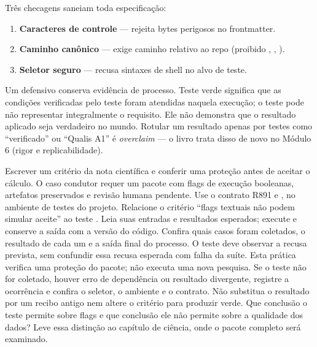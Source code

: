 \begin{metodo}
Três checagens saneiam toda especificação:
\begin{enumerate}[leftmargin=1.4em,itemsep=1pt]
\item \textbf{Caracteres de controle} — 
rejeita bytes perigosos no frontmatter.
\item \textbf{Caminho canônico} — 
exige caminho relativo ao repo (proibido \pth{/}, \pth{\textbackslash}, ).
\item \textbf{Seletor seguro} —  recusa
sintaxes de shell no alvo de teste.
\end{enumerate}
\end{metodo}

\begin{aviso}
Um  defensivo conserva evidência de processo.
Teste verde significa que as condições verificadas pelo teste foram atendidas
naquela execução; o teste pode não representar integralmente o requisito.
Ele não demonstra que o resultado aplicado seja verdadeiro no mundo.
Rotular um resultado apenas por testes como “verificado” ou “Qualis A1” é
\emph{overclaim} — o livro trata disso de novo no Módulo 6 (rigor e
replicabilidade).
\end{aviso}

\praticacore
{Escrever um critério da nota científica e conferir uma proteção antes de aceitar o cálculo.}
{O caso condutor requer um pacote com flags de execução booleanas, artefatos preservados e revisão humana pendente. Use o contrato R891 e , no ambiente de testes do projeto.}
{Relacione o critério ``flags textuais não podem simular aceite'' ao teste . Leia suas entradas e resultados esperados; execute  e conserve a saída com a versão do código.}
{Confira quais casos foram coletados, o resultado de cada um e a saída final do processo. O teste deve observar a recusa prevista, sem confundir essa recusa esperada com falha da suíte. Esta prática verifica uma proteção do pacote; não executa uma nova pesquisa.}
{Se o teste não for coletado, houver erro de dependência ou resultado divergente, registre a ocorrência e confira o seletor, o ambiente e o contrato. Não substitua o resultado por um recibo antigo nem altere o critério para produzir verde.}
{Que conclusão o teste permite sobre flags e que conclusão ele não permite sobre a qualidade dos dados? Leve essa distinção ao capítulo de ciência, onde o pacote completo será examinado.}

